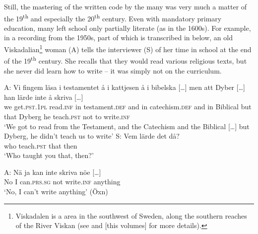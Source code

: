 \documentclass[output=paper]{langscibook}
\begin{document}
Still, the mastering of the written code by the many was very much a matter of the 19\textsuperscript{th} and especially the 20\textsuperscript{th} century. Even with mandatory primary education, many left school only partially literate (as in the 1600s). For example, in a recording from the 1950s, part of which is transcribed in  below, an old Viskadalian\footnote{Viskadalen is a  area in the southwest of Sweden, along the southern reaches of the River Viskan (see \citealt{Petzell2017,Petzell2018} and \citeyear{chapters/07} [this volumes] for more details).} woman (A) tells the interviewer (S) of her time in school at the end of the 19\textsuperscript{th} century. She recalls that they would read various religious texts, but she never did learn how to write – it was simply not on the curriculum.


\ea \label{ex:intro:4}
\ea
\gll A:    Vi   fingem                  läsa             i     testamentet            å     i     kattjesen å     i     bibelska […] men att   Dyber […] han lärde inte   å   {skriva […]}\\
     {}     we   get.\textsc{pst.1pl}  read.\textsc{inf} in   testament.\textsc{def} and   in   catechism.\textsc{def} and   in   Biblical   {}       but   that Dyberg   {}    he   teach.\textsc{pst} not   to   write\textsc{.inf}\\
    \glt `We got to read from the Testament, and the Catechism and the Biblical […] but Dyberg, he didn’t teach us to write’
\ex
\gll S:     Vem   lärde       det   då?\\
     {}  who    teach.\textsc{pst}  that  then\\
    \glt `Who taught you that, then?’

\gll A:   Nä   ja   kan           inte     skriva     nöe […]\\
  {} No  I  can\textsc{.prs.sg}   not  write.\textsc{inf}   anything  \\
    \glt `No, I can’t write anything’ (Öxn)
\z
\z
\end{document}
